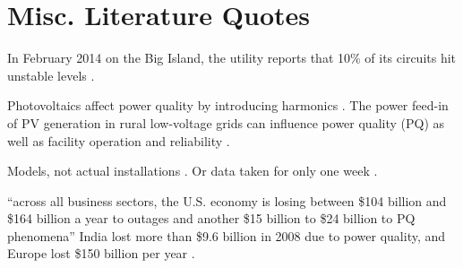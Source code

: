 \section{Misc. Literature Quotes}

In February 2014 on the Big Island, the utility reports that 10\% of its circuits hit unstable levels \cite{trabish_solar_2014}.

Photovoltaics affect power quality by introducing harmonics \cite{anurangi_effects_2017}. The power feed-in of PV generation in rural low-voltage grids can influence power quality (PQ) as well as facility operation and reliability \cite{rita_pinto_impact_2016}.

Models, not actual installations \cite{anurangi_effects_2017,bayindir_effects_2016,farhoodnea_power_2012,shafiullah_experimental_2014}. Or data taken for only one week \cite{kucuk_assessment_2013}.

``across all business sectors, the U.S. economy is losing between \$104 billion and \$164 billion a year to outages and another \$15 billion to \$24 billion to PQ phenomena'' \cite{elphick_summary_2015} India lost more than \$9.6 billion in 2008 due to power quality, and Europe lost \$150 billion per year \cite{laskar_power_2012}.
